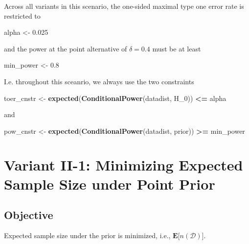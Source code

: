\documentclass[]{book}
\newenvironment{Shaded}{\begin{snugshade}}{\end{snugshade}}
\newcommand{\DecValTok}[1]{\textcolor[rgb]{0.00,0.00,0.81}{#1}}
\newcommand{\FloatTok}[1]{\textcolor[rgb]{0.00,0.00,0.81}{#1}}
\newcommand{\KeywordTok}[1]{\textcolor[rgb]{0.13,0.29,0.53}{\textbf{#1}}}
\newcommand{\NormalTok}[1]{#1}
\newcommand{\OperatorTok}[1]{\textcolor[rgb]{0.81,0.36,0.00}{\textbf{#1}}}
\newcommand{\StringTok}[1]{\textcolor[rgb]{0.31,0.60,0.02}{#1}}
\begin{document}
Across all variants in this scenario, the one-sided maximal
type one error rate is restricted to

\begin{Shaded}
\begin{Highlighting}[]
\NormalTok{alpha <-}\StringTok{ }\FloatTok{0.025}
\end{Highlighting}
\end{Shaded}

and the power at the point alternative of \(\delta=0.4\) must
be at least

\begin{Shaded}
\begin{Highlighting}[]
\NormalTok{min_power <-}\StringTok{ }\FloatTok{0.8}
\end{Highlighting}
\end{Shaded}

I.e. throughout this sceanrio, we always use the two
constraints

\begin{Shaded}
\begin{Highlighting}[]
\NormalTok{toer_cnstr <-}\StringTok{ }\KeywordTok{expected}\NormalTok{(}\KeywordTok{ConditionalPower}\NormalTok{(datadist, H_}\DecValTok{0}\NormalTok{)) }\OperatorTok{<=}\StringTok{ }\NormalTok{alpha}
\end{Highlighting}
\end{Shaded}

and

\begin{Shaded}
\begin{Highlighting}[]
\NormalTok{pow_cnstr <-}\StringTok{ }\KeywordTok{expected}\NormalTok{(}\KeywordTok{ConditionalPower}\NormalTok{(datadist, prior)) }\OperatorTok{>=}\StringTok{ }\NormalTok{min_power}
\end{Highlighting}
\end{Shaded}

\hypertarget{variantII_1}{%
\section{Variant II-1: Minimizing Expected Sample Size under Point Prior}\label{variantII_1}}

\hypertarget{objective-3}{%
\subsection{Objective}\label{objective-3}}

Expected sample size under the prior is minimized, i.e.,
\(\boldsymbol{E}\big[n(\mathcal{D})\big]\).
\end{document}
